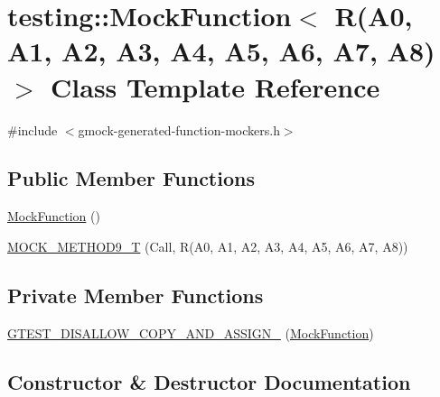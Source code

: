 \hypertarget{classtesting_1_1_mock_function_3_01_r_07_a0_00_01_a1_00_01_a2_00_01_a3_00_01_a4_00_01_a5_00_01_a6_00_01_a7_00_01_a8_08_4}{}\section{testing\+::Mock\+Function$<$ R(A0, A1, A2, A3, A4, A5, A6, A7, A8)$>$ Class Template Reference}
\label{classtesting_1_1_mock_function_3_01_r_07_a0_00_01_a1_00_01_a2_00_01_a3_00_01_a4_00_01_a5_00_01_a6_00_01_a7_00_01_a8_08_4}


{\ttfamily \#include $<$gmock-\/generated-\/function-\/mockers.\+h$>$}

\subsection*{Public Member Functions}
\begin{DoxyCompactItemize}
\item 
\mbox{\hyperlink{classtesting_1_1_mock_function_3_01_r_07_a0_00_01_a1_00_01_a2_00_01_a3_00_01_a4_00_01_a5_00_01_a6_00_01_a7_00_01_a8_08_4_a67f9fca4cf71a5811add15da604a6bbf}{Mock\+Function}} ()
\item 
\mbox{\hyperlink{classtesting_1_1_mock_function_3_01_r_07_a0_00_01_a1_00_01_a2_00_01_a3_00_01_a4_00_01_a5_00_01_a6_00_01_a7_00_01_a8_08_4_a0fee6ada67063cc8ec8b2181021f0195}{M\+O\+C\+K\+\_\+\+M\+E\+T\+H\+O\+D9\+\_\+T}} (Call, R(A0, A1, A2, A3, A4, A5, A6, A7, A8))
\end{DoxyCompactItemize}
\subsection*{Private Member Functions}
\begin{DoxyCompactItemize}
\item 
\mbox{\hyperlink{classtesting_1_1_mock_function_3_01_r_07_a0_00_01_a1_00_01_a2_00_01_a3_00_01_a4_00_01_a5_00_01_a6_00_01_a7_00_01_a8_08_4_ab2fa9029953595acdbbfc95b7544cb92}{G\+T\+E\+S\+T\+\_\+\+D\+I\+S\+A\+L\+L\+O\+W\+\_\+\+C\+O\+P\+Y\+\_\+\+A\+N\+D\+\_\+\+A\+S\+S\+I\+G\+N\+\_\+}} (\mbox{\hyperlink{classtesting_1_1_mock_function}{Mock\+Function}})
\end{DoxyCompactItemize}


\subsection{Constructor \& Destructor Documentation}
\mbox{\label{classtesting_1_1_mock_function_3_01_r_07_a0_00_01_a1_00_01_a2_00_01_a3_00_01_a4_00_01_a5_00_01_a6_00_01_a7_00_01_a8_08_4_a67f9fca4cf71a5811add15da604a6bbf}} 
